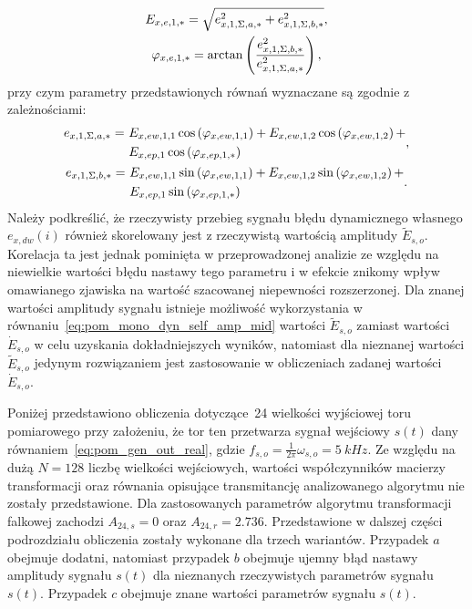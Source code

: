 \begin{gather}
E_{x,e,1,*} = \sqrt{e_{x,1,\Sigma,a,*}^{2} + e_{x,1,\Sigma,b,*}^{2}} \label{eq:pom_mono_dyn_sum_param_amp_mid}, \\
\varphi_{x,e,1,*} = \arctan \left(\frac{e_{x,1,\Sigma,b,*}^{2}}{e_{x,1,\Sigma,a,*}^{2}}\right) \label{eq:pom_mono_dyn_sum_param_phi_mid},
\end{gather}
przy czym parametry przedstawionych równań wyznaczane są zgodnie z zależnościami:
\begin{gather}
\begin{split}
e_{x,1,\Sigma,a,*} =~ & E_{x,ew,1,1} \cos \left(\varphi_{x,ew,1,1}\right) + E_{x,ew,1,2} \cos \left(\varphi_{x,ew,1,2}\right) + \\ & E_{x,ep,1} \cos \left(\varphi_{x,ep,1,*}\right)
\end{split}
\label{eq:pom_mono_dyn_sum_param_a_mid}, \\
\begin{split}
e_{x,1,\Sigma,b,*} =~ & E_{x,ew,1,1} \sin \left(\varphi_{x,ew,1,1}\right) + E_{x,ew,1,2} \sin \left(\varphi_{x,ew,1,2}\right) + \\ & E_{x,ep,1} \sin \left(\varphi_{x,ep,1,*}\right)
\end{split}
\label{eq:pom_mono_dyn_sum_param_b_mid}.
\end{gather}
Należy podkreślić, że rzeczywisty przebieg sygnału błędu dynamicznego własnego $e_{x,dw}(i)$ również skorelowany jest z rzeczywistą wartością amplitudy $\tilde{E}_{s,o}$. Korelacja ta jest jednak pominięta w przeprowadzonej analizie ze względu na niewielkie wartości błędu nastawy tego parametru i w efekcie znikomy wpływ omawianego zjawiska na wartość szacowanej niepewności rozszerzonej. Dla znanej wartości amplitudy sygnału istnieje możliwość wykorzystania w równaniu~\eqref{eq:pom_mono_dyn_self_amp_mid} wartości $\tilde{E}_{s,o}$ zamiast wartości $\dot{E}_{s,o}$ w celu uzyskania dokładniejszych wyników, natomiast dla nieznanej wartości $\tilde{E}_{s,o}$ jedynym rozwiązaniem jest zastosowanie w obliczeniach zadanej wartości $\dot{E}_{s,o}$.

Poniżej przedstawiono obliczenia dotyczące~\qty{24}{\numTej} wielkości wyjściowej toru pomiarowego przy założeniu, że tor ten przetwarza sygnał wejściowy $s(t)$ dany równaniem~\eqref{eq:pom_gen_out_real}, gdzie $f_{s,o} = \frac{1}{2\pi} \omega_{s,o} = \qty{5}{kHz}$. Ze względu na dużą $N = 128$ liczbę wielkości wejściowych, wartości współczynników macierzy transformacji oraz równania opisujące transmitancję analizowanego algorytmu nie zostały przedstawione. Dla zastosowanych parametrów algorytmu transformacji falkowej zachodzi $A_{24,s} = 0$ oraz $A_{24,r} = \num{2.736}$. Przedstawione w dalszej części podrozdziału obliczenia zostały wykonane dla trzech wariantów. Przypadek $a$ obejmuje dodatni, natomiast przypadek $b$ obejmuje ujemny błąd nastawy amplitudy sygnału $s(t)$ dla nieznanych rzeczywistych parametrów sygnału $s(t)$. Przypadek $c$ obejmuje znane wartości parametrów sygnału $s(t)$.

